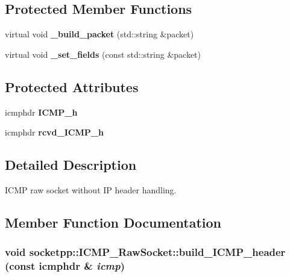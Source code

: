 \subsection*{Protected Member Functions}
\begin{CompactItemize}
\item 
\hypertarget{classsocketpp_1_1ICMP__RawSocket_d8aa8d45c57eb77ab99ee84f1c5dd7da}{
virtual void \textbf{\_\-build\_\-packet} (std::string \&packet)}
\label{classsocketpp_1_1ICMP__RawSocket_d8aa8d45c57eb77ab99ee84f1c5dd7da}

\item 
\hypertarget{classsocketpp_1_1ICMP__RawSocket_e183b11c080f5d74dbc386ec53e7feb5}{
virtual void \textbf{\_\-set\_\-fields} (const std::string \&packet)}
\label{classsocketpp_1_1ICMP__RawSocket_e183b11c080f5d74dbc386ec53e7feb5}

\end{CompactItemize}
\subsection*{Protected Attributes}
\begin{CompactItemize}
\item 
\hypertarget{classsocketpp_1_1ICMP__RawSocket_31f1ab3a8beaf8d4cb5b192e644e3f33}{
icmphdr \textbf{ICMP\_\-h}}
\label{classsocketpp_1_1ICMP__RawSocket_31f1ab3a8beaf8d4cb5b192e644e3f33}

\item 
\hypertarget{classsocketpp_1_1ICMP__RawSocket_1304716643ef2274b8c1c195359110c6}{
icmphdr \textbf{rcvd\_\-ICMP\_\-h}}
\label{classsocketpp_1_1ICMP__RawSocket_1304716643ef2274b8c1c195359110c6}

\end{CompactItemize}


\subsection{Detailed Description}
ICMP raw socket without IP header handling. 

\subsection{Member Function Documentation}
\hypertarget{classsocketpp_1_1ICMP__RawSocket_7d8d54d4771f4012246835819421fbeb}{
\subsubsection{\setlength{\rightskip}{0pt plus 5cm}void socketpp::ICMP\_\-RawSocket::build\_\-ICMP\_\-header (const icmphdr \& {\em icmp})}}
\label{classsocketpp_1_1ICMP__RawSocket_7d8d54d4771f4012246835819421fbeb}


